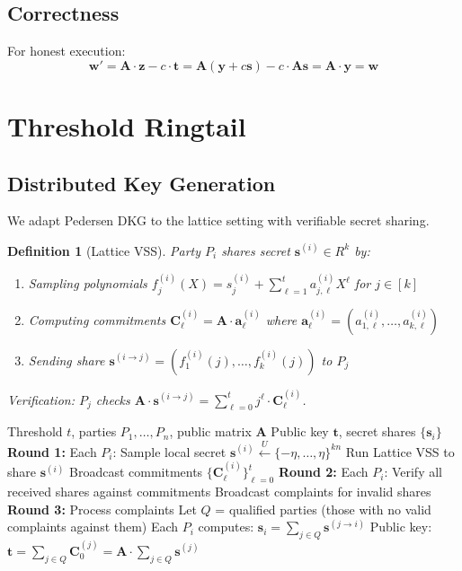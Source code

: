 \documentclass[11pt,a4paper]{article}
\newtheorem{definition}[theorem]{Definition}
\begin{document}
\subsection{Correctness}

For honest execution:
\[
\mathbf{w}' = \mathbf{A} \cdot \mathbf{z} - c \cdot \mathbf{t} = \mathbf{A}(\mathbf{y} + c\mathbf{s}) - c \cdot \mathbf{A}\mathbf{s} = \mathbf{A} \cdot \mathbf{y} = \mathbf{w}
\]

\section{Threshold Ringtail}

\subsection{Distributed Key Generation}

We adapt Pedersen DKG to the lattice setting with verifiable secret sharing.

\begin{definition}[Lattice VSS]
Party $P_i$ shares secret $\mathbf{s}^{(i)} \in R^k$ by:
\begin{enumerate}
    \item Sampling polynomials $f^{(i)}_j(X) = s^{(i)}_j + \sum_{\ell=1}^{t} a^{(i)}_{j,\ell} X^\ell$ for $j \in [k]$
    \item Computing commitments $\mathbf{C}^{(i)}_\ell = \mathbf{A} \cdot \mathbf{a}^{(i)}_\ell$ where $\mathbf{a}^{(i)}_\ell = (a^{(i)}_{1,\ell}, \ldots, a^{(i)}_{k,\ell})$
    \item Sending share $\mathbf{s}^{(i \to j)} = (f^{(i)}_1(j), \ldots, f^{(i)}_k(j))$ to $P_j$
\end{enumerate}
Verification: $P_j$ checks $\mathbf{A} \cdot \mathbf{s}^{(i \to j)} = \sum_{\ell=0}^{t} j^\ell \cdot \mathbf{C}^{(i)}_\ell$.
\end{definition}

\begin{algorithm}
\caption{Ringtail-DKG}
\begin{algorithmic}[1]
\Require Threshold $t$, parties $P_1, \ldots, P_n$, public matrix $\mathbf{A}$
\Ensure Public key $\mathbf{t}$, secret shares $\{\mathbf{s}_i\}$
\State \textbf{Round 1:} Each $P_i$:
\State \quad Sample local secret $\mathbf{s}^{(i)} \xleftarrow{U} \{-\eta, \ldots, \eta\}^{kn}$
\State \quad Run Lattice VSS to share $\mathbf{s}^{(i)}$
\State \quad Broadcast commitments $\{\mathbf{C}^{(i)}_\ell\}_{\ell=0}^{t}$
\State \textbf{Round 2:} Each $P_i$:
\State \quad Verify all received shares against commitments
\State \quad Broadcast complaints for invalid shares
\State \textbf{Round 3:} Process complaints
\State Let $Q$ = qualified parties (those with no valid complaints against them)
\State Each $P_i$ computes: $\mathbf{s}_i = \sum_{j \in Q} \mathbf{s}^{(j \to i)}$
\State Public key: $\mathbf{t} = \sum_{j \in Q} \mathbf{C}^{(j)}_0 = \mathbf{A} \cdot \sum_{j \in Q} \mathbf{s}^{(j)}$
\end{algorithmic}
\end{algorithm}
\end{document}
